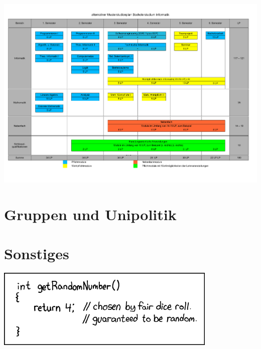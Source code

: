 \documentclass[]{papertex}
\begin{document}
		\newpage
		\begin{minipage}{1.0\linewidth}
		\begin{center} 
  			\includegraphics[angle=90,totalheight=\textheight,
			width=\textwidth
			]{bilder/studienplan_bsc_ws/studienplan_bsc.pdf}
  			\label{studienplan_neu}
		\end{center}
		\end{minipage}
	\newpage
	\section{Gruppen und Unipolitik}
		\label{politik}
		\begin{multicols}{2}
		\end{multicols}
	\newpage
	\section{Sonstiges}
		\label{sonstiges}
		\begin{center}
		\includegraphics[totalheight=3cm]{bilder/XKCD/random_number}
		\end{center}
		\begin{multicols}{2}
		\end{multicols}
		\begin{multicols}{2}
		
		\end{multicols}
		\newpage
		
\end{document}
